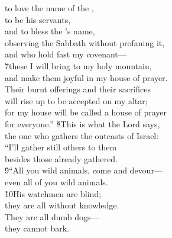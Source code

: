 \begin{poetry}
\poemlll       to love the name of the , \\
\poeml to be his servants, \\
\poemll    and to bless the 's name, \\
\poeml observing the Sabbath without profaning it, \\
\poemll    and who hold fast my covenant--- \\
\poeml \v{7}these I will bring to my holy mountain, \\
\poemll    and make them joyful in my house of prayer. \\
\poeml Their burnt offerings and their sacrifices \\
\poemll    will rise up to be accepted on my altar; \\
\poeml for my house will be called a house of prayer \\
\poemll    for everyone.''
\poeml \v{8}This is what the Lord  says, \\
\poemll    the one who gathers the outcasts of Israel: \\
\poeml ``I'll gather still others to them \\
\poemll    besides those already gathered. \\
\poeml \v{9}``All you wild animals, come and devour--- \\
\poemll    even all of you wild animals. \\
\poeml \v{10}His watchmen are blind; \\
\poemll    they are all without knowledge. \\
\poeml They are all dumb dogs--- \\
\poemll    they cannot bark. \\

\end{poetry}
